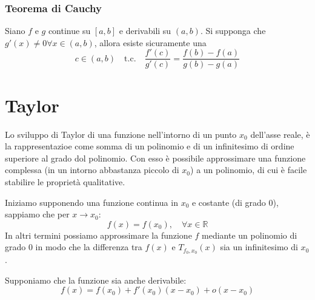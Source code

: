 \documentclass[x11names]{article}
\begin{document}
	\begin{center}
		\colorbox{myred}{\begin{minipage}{5.75in}
				\begin{redes}{}
					\subsubsection{Teorema di Cauchy}
					Siano $f$ e $g$ continue su $[a,b]$ e derivabili su $(a,b)$. Si supponga che $g'(x) \neq 0 \forall x \in (a,b)$, allora esiste sicuramente una
					\[
					c \in (a,b) \quad \text{t.c.} \quad \frac{f'(c)}{g'(c)} = \frac{f(b) - f(a)}{g(b) - g(a)}
					\]
				\end{redes}
		\end{minipage}}        
	\end{center}
	
	
	\section{Taylor}
	Lo sviluppo di Taylor di una funzione nell'intorno di un punto $x_0$ dell'asse reale, è la rappresentazioe come somma di un polinomio e di un infinitesimo di ordine superiore al grado dol polinomio. Con esso è possibile approssimare una funzione complessa (in un intorno abbastanza piccolo di $x_0$) a un polinomio, di cui è facile stabilire le proprietà qualitative.
	
	Iniziamo supponendo una funzione continua in $x_0$ e costante (di grado 0), sappiamo che per $x\to x_0$:
	\[
	f(x) = f(x_0), \quad \forall x \in \mathbb{R}
	\]
	In altri termini possiamo approssimare la funzione $f$ mediante un polinomio di grado 0 in modo che la differenza tra $f(x)$ e $T_{f_0,x_0}(x)$ sia un infinitesimo di $x_0$.
	
	Supponiamo che la funzione sia anche derivabile:
	\[
	f(x) = f(x_0) + f'(x_0)(x-x_0) + o(x-x_0)
	\]
	
\end{document}
